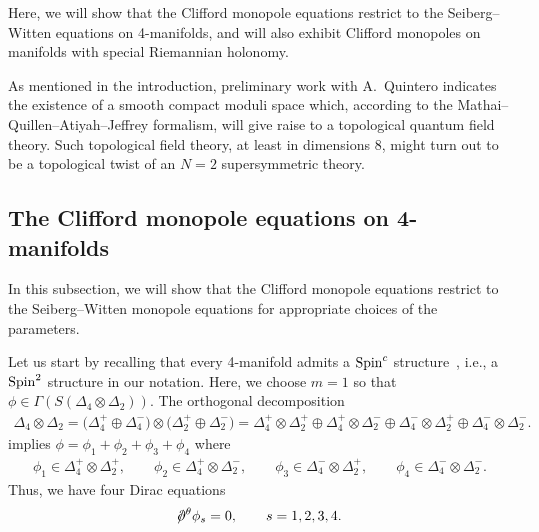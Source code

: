 \documentclass[pdftex]{sigma}
\newcommand{\dirac}{/\kern-5pt\partial}
\numberwithin{equation}{section}
\begin{document}
Here, we will show that the Clifford monopole equations restrict to the Seiberg--Witten equations on 4-manifolds, and will also exhibit Clifford monopoles on manifolds with special Riemannian holonomy.

 As mentioned in the introduction, preliminary work with A.~Quintero indicates the existence of a smooth compact moduli space which, according to the Mathai--Quillen--Atiyah--Jeffrey formalism, will give raise to a topological quantum field theory. Such topological field theory, at least in dimensions $8$, might turn out to be a topological twist of an $N=2$ supersymmetric theory.

\subsection{The Clifford monopole equations on 4-manifolds}

In this subsection, we will show that the Clifford monopole equations restrict to the Seiberg--Witten monopole equations for appropriate choices of the parameters.

Let us start by recalling that every 4-manifold admits a ${\rm Spin}^c$ structure~\cite{Morgan}, i.e., a ${\rm Spin}^2$ structure in our notation. Here, we choose $m=1$ so that $\phi\in\Gamma(S(\Delta_4\otimes \Delta_2))$. The orthogonal decomposition
\begin{gather*}
\Delta_4\otimes \Delta_2 = \big(\Delta_4^+\oplus \Delta_4^-\big)\otimes \big(\Delta_2^+\oplus \Delta_2^-\big) =
 \Delta_4^+\otimes \Delta_2^+ \oplus \Delta_4^+\otimes \Delta_2^- \oplus \Delta_4^-\otimes \Delta_2^+ \oplus \Delta_4^-\otimes \Delta_2^- .
\end{gather*}
implies $\phi=\phi_1+\phi_2+\phi_3+\phi_4$ where
\begin{gather*}
\phi_1 \in \Delta_4^+\otimes\Delta_2^+,\qquad
\phi_2 \in \Delta_4^+\otimes\Delta_2^-,\qquad
\phi_3 \in \Delta_4^-\otimes\Delta_2^+,\qquad
\phi_4 \in \Delta_4^-\otimes\Delta_2^-.
\end{gather*}
Thus, we have four Dirac equations
\begin{gather*}
\dirac^\theta\phi_s =0,\qquad s=1,2,3,4.
\end{gather*}
\end{document}
